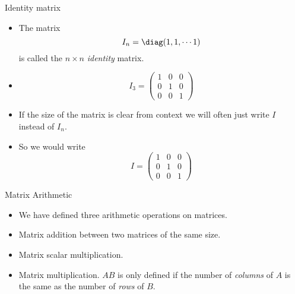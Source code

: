 \documentclass{beamer}
\begin{document}
\begin{frame}{Identity matrix}

\begin{itemize}
\item The matrix
$$I_n = \diag(1, 1, \cdots 1)$$
is called the $n\times n$ \emph{identity} matrix.
\item
$$
I_3 =
\begin{pmatrix}
1 & 0 & 0 \\
0 & 1 & 0 \\
0 & 0 & 1
\end{pmatrix}
$$
\item If the size of the matrix is clear from context we will often just
write $I$ instead of $I_n$.
\item So we would write
$$
I=
\begin{pmatrix}
1 & 0 & 0 \\
0 & 1 & 0 \\
0 & 0 & 1
\end{pmatrix}
$$
\end{itemize}
\end{frame}




\begin{frame}{Matrix Arithmetic}

\begin{itemize}
\item We have defined three arithmetic operations on matrices.
\item Matrix addition between two matrices of the same size.
\item Matrix scalar multiplication.
\item Matrix multiplication. $A B$ is only defined if the number of
\emph{columns} of $A$ is the same as the number of \emph{rows} of $B$.
\end{itemize}

\end{frame}

\end{document}
